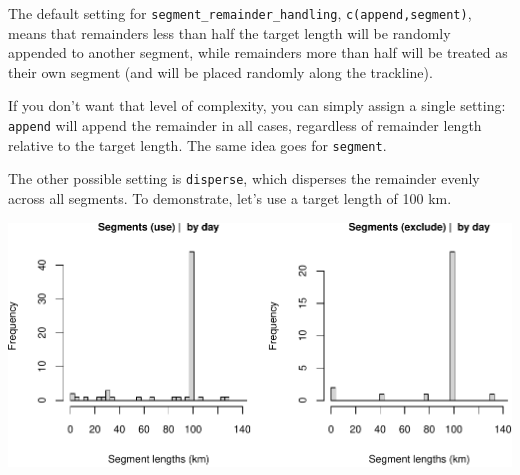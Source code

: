 \documentclass[
]{book}
\newenvironment{Shaded}{\begin{snugshade}}{\end{snugshade}}
\newcommand{\CommentTok}[1]{\textcolor[rgb]{0.56,0.35,0.01}{\textit{#1}}}
\newcommand{\DataTypeTok}[1]{\textcolor[rgb]{0.13,0.29,0.53}{#1}}
\newcommand{\DecValTok}[1]{\textcolor[rgb]{0.00,0.00,0.81}{#1}}
\newcommand{\KeywordTok}[1]{\textcolor[rgb]{0.13,0.29,0.53}{\textbf{#1}}}
\newcommand{\NormalTok}[1]{#1}
\newcommand{\OperatorTok}[1]{\textcolor[rgb]{0.81,0.36,0.00}{\textbf{#1}}}
\newcommand{\OtherTok}[1]{\textcolor[rgb]{0.56,0.35,0.01}{#1}}
\newcommand{\StringTok}[1]{\textcolor[rgb]{0.31,0.60,0.02}{#1}}
\begin{document}
The default setting for \texttt{segment\_remainder\_handling}, \texttt{c(\textquotesingle{}append\textquotesingle{},\textquotesingle{}segment\textquotesingle{})}, means that remainders less than half the target length will be randomly appended to another segment, while remainders more than half will be treated as their own segment (and will be placed randomly along the trackline).

If you don't want that level of complexity, you can simply assign a single setting: \texttt{\textquotesingle{}append\textquotesingle{}} will append the remainder in all cases, regardless of remainder length relative to the target length. The same idea goes for \texttt{\textquotesingle{}segment\textquotesingle{}}.

The other possible setting is \texttt{\textquotesingle{}disperse\textquotesingle{}}, which disperses the remainder evenly across all segments. To demonstrate, let's use a target length of 100 km.

\begin{Shaded}
\end{Shaded}

\includegraphics{figures/unnamed-chunk-107-1.pdf}
\end{document}
